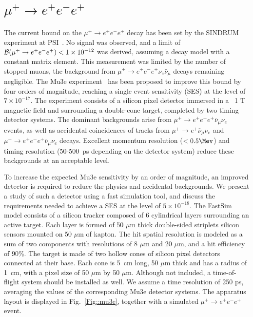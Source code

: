 \section{$\mu^+\to e^+e^-e^+$}
\label{mutoeee}

The current bound on the $\mu^+\to e^+e^-e^+$ decay has been set by the SINDRUM experiment at PSI~\cite{Bellgardt:1987du}. No signal was observed, and a limit of ${\cal B}(\mu^+\to e^+e^-e^+) < 1\times 10^{-12}$ was derived, assuming a decay model with a constant matrix element. This measurement was limited by the number of stopped muons, the background from $\mu^+\to e^+e^-e^+ \nu_e \bar\nu_\mu$ decays remaining negligible. The Mu3e experiment~\cite{Blondel:2013ia} has been proposed to improve this bound by four orders of magnitude, reaching a single event sensitivity (SES) at the level of $7 \times 10^{-17}$. The experiment consists of a silicon pixel detector immersed in a ~1 T magnetic field and surrounding a double-cone target, completed by two timing detector systems. The dominant backgrounds arise from $\mu^+ \rightarrow e^+e^-e^+ \overline{\nu}_{\mu} \nu_e$ events, as well as accidental coincidences of tracks from $\mu^+ \rightarrow e^+ \overline{\nu}_{\mu} \nu_e$ and $\mu^+ \rightarrow e^+e^-e^+ \overline{\nu}_{\mu} \nu_e$ decays. Excellent momentum resolution ($<0.5 \Mev$) and timing resolution (50-500~ps depending on the detector system) reduce these backgrounds at an acceptable level.

To increase the expected Mu3e sensitivity by an order of magnitude, an improved detector is required to reduce the physics and accidental backgrounds. We present a study of such a detector using a fast simulation tool, and discuss the requirements needed to achieve a SES at the level of $5 \times 10^{-18}$. The FastSim model consists of a silicon tracker composed of 6 cylindrical layers surrounding an active target. Each layer is formed of 50 $\mu$m thick double-sided striplets silicon sensors mounted on 50 $\mu$m of kapton. The hit spatial resolution is modeled as a sum of two components with resolutions of 8 $\mu$m and 20 $\mu$m, and a hit efficiency of 90\%. The target is made of two hollow cones of silicon pixel detectors connected at their base. Each cone is 5~cm long, 50 $\mu$m thick and has a radius of 1~cm, with a pixel size of 50 $\mu$m by 50 $\mu$m. Although not included, a time-of-flight system should be installed as well. We assume a time resolution of 250 ps, averaging the values of the corresponding Mu3e detector systems. The apparatus layout is displayed in Fig.~\ref{Fig::mu3e}, together with a simulated $\mu^+ \rightarrow e^+e^-e^+$ event.

